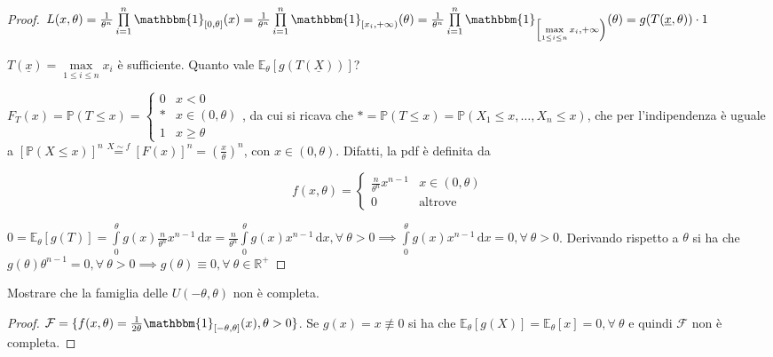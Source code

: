 \documentclass[hidelinks, 10pt]{report}
\begin{document}
\begin{proof}
$ L(x, \theta) = \frac{1}{\theta^{n}} \prod\limits_{i = 1}^{n} \mathbbm{1}_{[0, \theta]} (x) = \frac{1}{\theta^{n}} \prod\limits_{i = 1}^{n} \mathbbm{1}_{[x_i, +\infty)} (\theta) = \frac{1}{\theta^{n}} \prod\limits_{i = 1}^{n} \mathbbm{1}_{\left[ \max\limits_{1 \le i \le n} x_i, +\infty \right)} (\theta) = g(T(\underline{x}, \theta)) \cdot 1 $

$ T(\underline{x}) = \max\limits_{1 \le i \le n} x_{i} $ \`e sufficiente. Quanto vale $ \mathbb{E}_{\theta} [g(T(\underline{X}))] $?

$ F_{T} (x) = \mathbb{P} (T \le x) = \begin{cases} 0 & x < 0 \\ \ast & x \in (0, \theta) \\ 1 & x \ge \theta \end{cases} $, da cui si ricava che $ \ast = \mathbb{P} (T \le x) = \mathbb{P} (X_{1} \le x, \dotsc, X_{n} \le x) $, che per l'indipendenza \`e uguale a $ [\mathbb{P} (X \le x)]^{n} \stackrel{X \sim f}{=} [F(x)]^{n} = \left( \frac{x}{\theta} \right)^{n} $, con $ x \in (0, \theta) $. Difatti, la pdf \`e definita da

\[ f(x, \theta) = \begin{cases}
\frac{n}{\theta^{n}} x^{n - 1} & x \in (0, \theta) \\
0 & \text{altrove}
\end{cases} \]

$ 0 = \mathbb{E}_{\theta} [g(T)] = \int\limits_{0}^{\theta} g(x) \frac{n}{\theta^{n}} x^{n-1} \, \mathrm{d}x = \frac{n}{\theta^{n}} \int\limits_{0}^{\theta} g(x) x^{n - 1} \, \mathrm{d}x, \forall\ \theta > 0 \implies \int\limits_{0}^{\theta} g(x) x^{n - 1} \, \mathrm{d}x = 0, \forall\ \theta > 0 $. Derivando rispetto a $ \theta $ si ha che $ g(\theta)\theta^{n - 1} = 0, \forall\ \theta > 0 \implies g(\theta) \equiv 0, \forall\ \theta \in \mathbb{R}^{+}$
\end{proof}

\begin{ex}
Mostrare che la famiglia delle $ U(-\theta, \theta) $ non \`e completa.
\end{ex}

\begin{proof}
$ \mathcal{F} = \{ f(x, \theta) = \frac{1}{2 \theta} \mathbbm{1}_{[-\theta, \theta]} (x), \theta > 0 \} $. Se $ g(x) = x \not\equiv 0 $ si ha che $ \mathbb{E}_{\theta} [g(X)] = \mathbb{E}_{\theta} [x] = 0, \forall\ \theta $ e quindi $ \mathcal{F} $ non \`e completa.
\end{proof}
\end{document}
